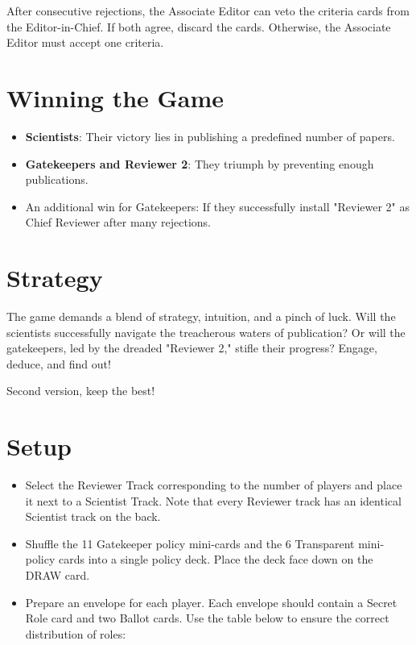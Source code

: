 \documentclass[sigplan,screen,nonacm]{acmart}
\begin{document}
After consecutive rejections, the Associate Editor can veto the criteria cards from the Editor-in-Chief. If both agree, discard the cards. Otherwise, the Associate Editor must accept one criteria.

\section{Winning the Game}

\begin{itemize}
	\item \textbf{Scientists}: Their victory lies in publishing a predefined number of papers.
	\item \textbf{Gatekeepers and Reviewer 2}: They triumph by preventing enough publications.
	\item An additional win for Gatekeepers: If they successfully install "Reviewer 2" as Chief Reviewer after many rejections.
\end{itemize}

\section*{Strategy}

The game demands a blend of strategy, intuition, and a pinch of luck. Will the scientists successfully navigate the treacherous waters of publication? Or will the gatekeepers, led by the dreaded "Reviewer 2," stifle their progress? Engage, deduce, and find out!

\clearpage

Second version, keep the best!

\section{Setup}

\begin{itemize}
	\item Select the Reviewer Track corresponding to the number of players and place it next to a Scientist Track. Note that every Reviewer track has an identical Scientist track on the back.
	\item Shuffle the 11 Gatekeeper policy mini-cards and the 6 Transparent mini-policy cards into a single policy deck. Place the deck face down on the DRAW card.
	\item Prepare an envelope for each player. Each envelope should contain a Secret Role card and two Ballot cards. Use the table below to ensure the correct distribution of roles:
\end{itemize}
\end{document}
